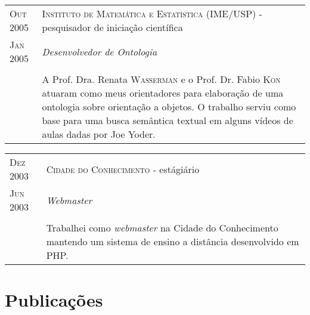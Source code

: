 \documentclass[letter,10pt]{article}
\begin{document}
\begin{tabular}{p{2.5cm}|p{13.5cm}}
  \textsc{Out 2005} & \textsc{Instituto de Matemática e Estatística
    (IME/USP)} - pesquisador de iniciação científica\\
  \textsc{Jan 2005}& \emph{Desenvolvedor de Ontologia}\\
  &\\
  & A Prof. Dra. Renata \textsc{Wasserman} e o Prof. Dr. Fabio
  \textsc{Kon} atuaram como meus orientadores para elaboração de uma
  ontologia sobre orientação a objetos. O trabalho serviu como base
  para uma busca semântica textual em alguns vídeos de aulas dadas por
  Joe Yoder.
\end{tabular}

\begin{tabular}{p{2.5cm}|p{13.5cm}}
  \textsc{Dez 2003} & \textsc{Cidade do Conhecimento} - estágiário\\
  \textsc{Jun 2003}& \emph{Webmaster}\\
  &\\
  & Trabalhei como \textit{webmaster} na Cidade do Conhecimento
  mantendo um sistema de ensino a distância desenvolvido em PHP.
\end{tabular}

\section{Publicações}
\end{document}
